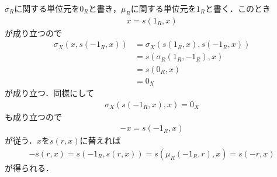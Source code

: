 	\begin{sketch}
		$\sigma_R$に関する単位元を$0_R$と書き，$\mu_R$に関する単位元を$1_R$と書く．このとき
		\begin{align}
			x = s\left(1_R,x\right)
		\end{align}
		が成り立つので
		\begin{align}
			\sigma_X\left(x,s\left(-1_R,x\right)\right) &= \sigma_X\left(s\left(1_R,x\right),s\left(-1_R,x\right)\right) \\
			&= s\left(\sigma_R\left(1_R,-1_R\right),x\right) \\
			&= s\left(0_R,x\right) \\
			&= 0_X
		\end{align}
		が成り立つ．同様にして
		\begin{align}
			\sigma_X\left(s\left(-1_R,x\right),x\right) = 0_X
		\end{align}
		も成り立つので
		\begin{align}
			-x = s\left(-1_R,x\right)
		\end{align}
		が従う．$x$を$s(r,x)$に替えれば
		\begin{align}
			-s(r,x) = s\left(-1_R,s(r,x)\right)
			= s\left(\mu_R(-1_R,r),x\right)
			= s\left(-r,x\right)
		\end{align}
		が得られる．
		\QED
	\end{sketch}
	
	\begin{screen}
		\begin{dfn}[加群準同型]
			
		\end{dfn}
	\end{screen}